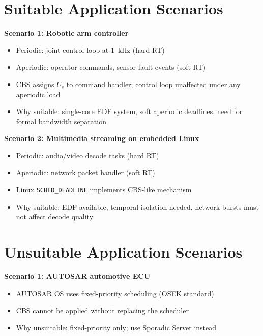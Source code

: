 \documentclass[conference]{IEEEtran}
\begin{document}
\section{Suitable Application Scenarios}

\textbf{Scenario 1: Robotic arm controller}
\begin{itemize}
  \item Periodic: joint control loop at 1~kHz (hard RT)
  \item Aperiodic: operator commands, sensor fault events (soft RT)
  \item CBS assigns $U_s$ to command handler; control loop unaffected
        under any aperiodic load
  \item Why suitable: single-core EDF system, soft aperiodic deadlines,
        need for formal bandwidth separation
\end{itemize}

\textbf{Scenario 2: Multimedia streaming on embedded Linux}
\begin{itemize}
  \item Periodic: audio/video decode tasks (hard RT)
  \item Aperiodic: network packet handler (soft RT)
  \item Linux \texttt{SCHED\_DEADLINE} implements CBS-like mechanism
  \item Why suitable: EDF available, temporal isolation needed,
        network bursts must not affect decode quality
\end{itemize}

\section{Unsuitable Application Scenarios}

\textbf{Scenario 1: AUTOSAR automotive ECU}
\begin{itemize}
  \item AUTOSAR OS uses fixed-priority scheduling (OSEK standard)
  \item CBS cannot be applied without replacing the scheduler
  \item Why unsuitable: fixed-priority only; use Sporadic Server instead
\end{itemize}
\end{document}
